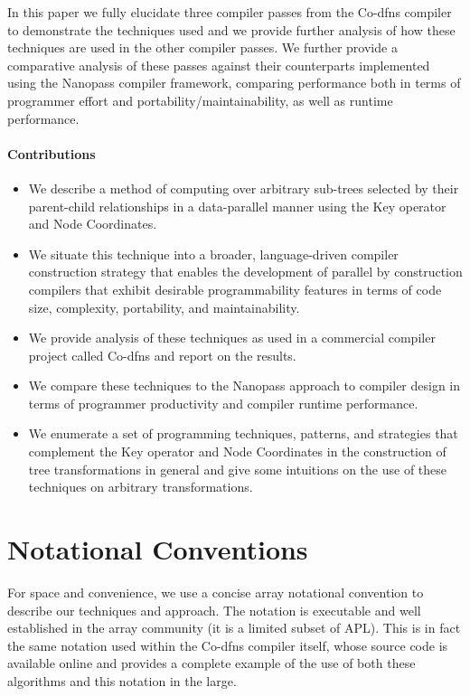 \documentclass[numbers,preprint]{sigplanconf}
\begin{document}
In this paper we fully elucidate three compiler passes from the Co-dfns
compiler to demonstrate the techniques used and we provide further
analysis of how these techniques are used in the other compiler
passes. We further provide a comparative analysis of these passes
against their counterparts implemented using the Nanopass compiler
framework, comparing performance both in terms of programmer effort
and portability/maintainability, as well as runtime performance.

\paragraph{Contributions}

\begin{itemize}[noitemsep]

\item We describe a method of computing over arbitrary sub-trees
selected by their parent-child relationships in a data-parallel manner
using the Key operator and Node Coordinates.

\item We situate this technique into a broader, language-driven
compiler construction strategy that enables the development of parallel
by construction compilers that exhibit desirable programmability
features in terms of code size, complexity, portability, and
maintainability.

\item We provide analysis of these techniques as used in a commercial
compiler project called Co-dfns and report on the results.

\item We compare these techniques to the Nanopass approach to
compiler design in terms of programmer productivity and compiler
runtime performance.

\item We enumerate a set of programming techniques, patterns, and
strategies that complement the Key operator and Node Coordinates
in the construction of tree transformations in general and give some
intuitions on the use of these techniques on arbitrary transformations.
\end{itemize}

\section{Notational Conventions}

For space and convenience, we use a concise array notational convention to 
describe our techniques and approach. The notation is executable and well 
established in the array community (it is a limited subset of APL). This is 
in fact the same notation used within the Co-dfns compiler itself, whose 
source code is available online and provides a complete example of the use 
of both these algorithms and this notation in the large. 
\end{document}
